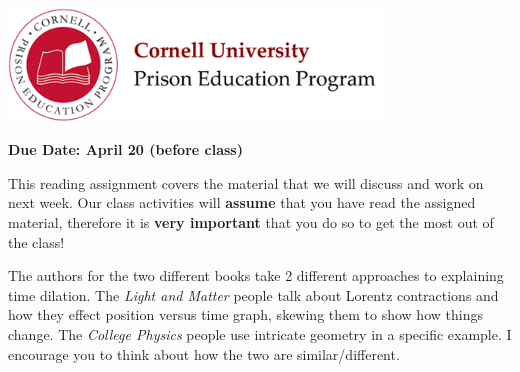 \documentclass[addpoints,12pt]{exam}
\begin{document}

\begin{flushright}
\vspace{0.2in}

\end{flushright}

\begin{center}
\includegraphics[width=10cm]{../images/logo.png}
\end{center}

\begin{center}
\end{center}

\noindent\begin{large}\textbf{Due Date: April 20 (before class)}\end{large}
\vspace{0.2in}

This reading assignment covers the material that we will discuss and work on next week. Our class activities will \textbf{assume} that you have read the assigned material, therefore it is \textbf{very important} that you do so to get the most out of the class!

The authors for the two different books take 2 different approaches to explaining time dilation. The \textit{Light and Matter} people talk about Lorentz contractions and how they effect position versus time graph, skewing them to show how things change. The \textit{College Physics} people use intricate geometry in a specific example. I encourage you to think about how the two are similar/different.
\end{document}

